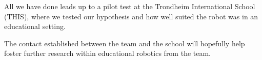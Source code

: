 \bigskip\noindent
All we have done leads up to a pilot test at the Trondheim International School (THIS), where we tested our hypothesis and how well suited the \chirp robot was in an educational setting. 

\bigskip\noindent
The contact established between the \chirp team and the school will hopefully help foster further research within educational robotics from the \chirp team.





